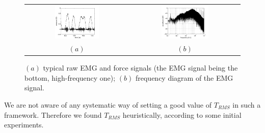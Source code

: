 \begin{figure}[!ht] \centering
  \begin{tabular}{cc}
    \includegraphics[width=0.45\textwidth]{figs/force_raw} &
    \includegraphics[width=0.45\textwidth]{figs/spectrum_raw} \\
    $(a)$ & $(b)$ \\
  \end{tabular}
  \caption{$(a)$ typical raw EMG and force signals (the EMG signal
    being the bottom, high-frequency one); $(b)$ frequency diagram of
    the EMG signal.}
  \label{fig:spectra}
\end{figure}


We are not aware of any systematic way of setting a good value of
$T_{RMS}$ in such a framework. Therefore we found $T_{RMS}$
heuristically, according to some initial experiments.

